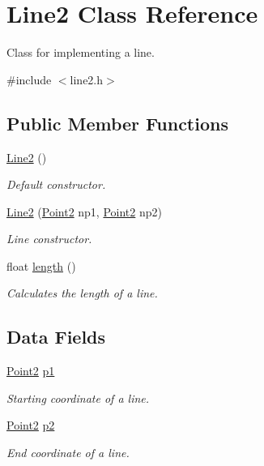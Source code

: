 \hypertarget{class_line2}{}\section{Line2 Class Reference}
\label{class_line2}


Class for implementing a line.  




{\ttfamily \#include $<$line2.\+h$>$}

\subsection*{Public Member Functions}
\begin{DoxyCompactItemize}
\item 
\mbox{\hyperlink{class_line2_a064601d6fbf1cd8002e24cade29b07d6}{Line2}} ()
\begin{DoxyCompactList}\small\item\em Default constructor. \end{DoxyCompactList}\item 
\mbox{\hyperlink{class_line2_afa9636d43e54ba41fb108207a83aad1a}{Line2}} (\mbox{\hyperlink{class_point2}{Point2}} np1, \mbox{\hyperlink{class_point2}{Point2}} np2)
\begin{DoxyCompactList}\small\item\em Line constructor. \end{DoxyCompactList}\item 
float \mbox{\hyperlink{class_line2_aa9216f71f2684ccff858dadf26bdad8f}{length}} ()
\begin{DoxyCompactList}\small\item\em Calculates the length of a line. \end{DoxyCompactList}\end{DoxyCompactItemize}
\subsection*{Data Fields}
\begin{DoxyCompactItemize}
\item 
\mbox{\hyperlink{class_point2}{Point2}} \mbox{\hyperlink{class_line2_a050658f54921e102d7ce6ae59a03584e}{p1}}
\begin{DoxyCompactList}\small\item\em Starting coordinate of a line. \end{DoxyCompactList}\item 
\mbox{\hyperlink{class_point2}{Point2}} \mbox{\hyperlink{class_line2_a5bc874958132ebdc2fe18aced3a35e72}{p2}}
\begin{DoxyCompactList}\small\item\em End coordinate of a line. \end{DoxyCompactList}\end{DoxyCompactItemize}
